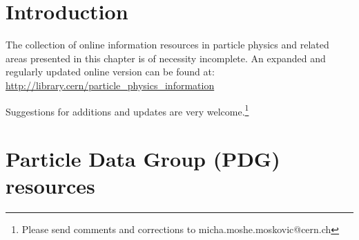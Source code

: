 \section{Introduction}\label{databases:sec:introduction}
The collection of online information resources in particle physics and
related areas presented in this chapter is of necessity incomplete. An
expanded and regularly updated online version can be found at:
\url{http://library.cern/particle_physics_information}

Suggestions for additions and updates are very welcome.\footnote{Please
  send comments and corrections to micha.moshe.moskovic@cern.ch}

\section{Particle Data Group (PDG)
resources}\label{databases:sec:resources}

